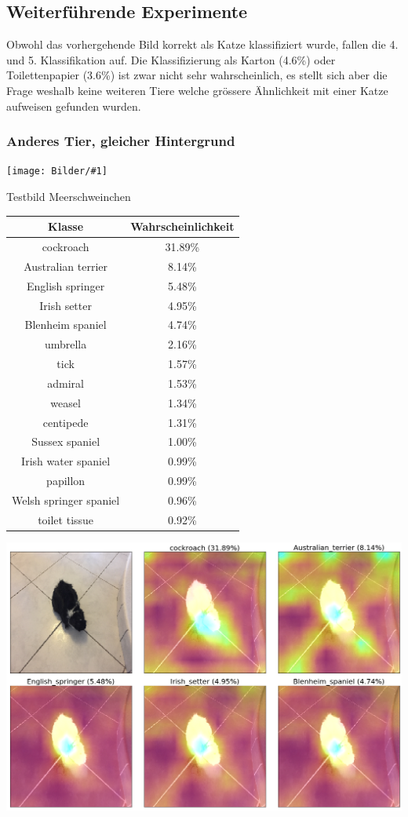 \documentclass[
  12pt, %
  a4paper, %
  oneside, %
  openany, 
  numbers=noenddot, %
  BCOR=5mm, %
  parskip=half*, %
  thesis, %
]{bfhbook}
\newcommand{\imgText}[3]{
\begin{center}
    \begin{minipage}[t]{0.6\textwidth}
    		\vspace{0pt}
		\texttt{[image: Bilder/\#1]}
		\caption{#2}
	\end{minipage}\hfill
    \begin{minipage}[t]{0.4\textwidth}
    		\vspace{0pt}
  		#3
    \end{minipage}
\end{center}
}
\begin{document}
\subsection*{Weiterführende Experimente}
Obwohl das vorhergehende Bild korrekt als Katze klassifiziert wurde, fallen die 4. und 5. Klassifikation auf. Die Klassifizierung als Karton (4.6\%) oder Toilettenpapier (3.6\%) ist zwar nicht sehr wahrscheinlich, es stellt sich aber die Frage weshalb keine weiteren Tiere welche grössere Ähnlichkeit mit einer Katze aufweisen gefunden wurden.

\subsubsection*{Anderes Tier, gleicher Hintergrund}
\imgText{IMG_2729.JPG}{Testbild Meerschweinchen}{
	\begin{tabular}{ |c|c| } 
		 \hline
		 Klasse & Wahrscheinlichkeit \\
		 \hline
		cockroach & 31.89\% \\
		Australian terrier &  8.14\% \\
		English springer & 5.48\% \\
		Irish setter & 4.95\% \\
		Blenheim spaniel & 4.74\% \\
		umbrella & 2.16\% \\
		tick & 1.57\% \\
		admiral & 1.53\% \\
		weasel  & 1.34\% \\
		centipede & 1.31\% \\
		Sussex spaniel & 1.00\% \\
		Irish water spaniel  & 0.99\% \\
		papillon & 0.99\% \\
		Welsh springer spaniel  & 0.96\% \\
		toilet tissue & 0.92\% \\
		\end{tabular}
}
\break
\includegraphics[width=\textwidth]{Bilder/Oreo-Grad-Cam-Classes.png}
\end{document}
